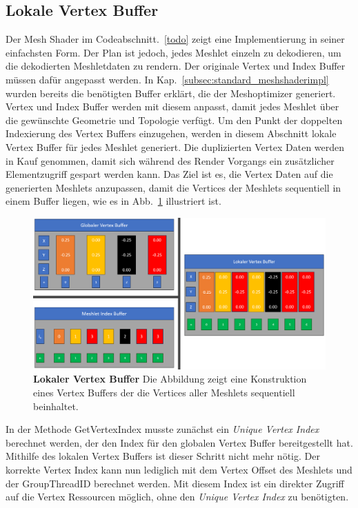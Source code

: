 \subsection{Lokale Vertex Buffer}
\label{subsec:local_vertex_buffers}
Der Mesh Shader im Codeabschnitt.~\ref{todo} zeigt eine Implementierung in seiner einfachsten Form.
Der Plan ist jedoch, jedes Meshlet einzeln zu dekodieren, um die dekodierten Meshletdaten zu rendern.
Der originale Vertex und Index Buffer müssen dafür angepasst werden.
In Kap.~\ref{subsec:standard_meshshaderimpl} wurden bereits die benötigten Buffer erklärt, die der Meshoptimizer generiert.
Vertex und Index Buffer werden mit diesem anpasst, damit jedes Meshlet über die gewünschte Geometrie und Topologie verfügt. \newline
Um den Punkt der doppelten Indexierung des Vertex Buffers einzugehen, werden in diesem Abschnitt lokale Vertex Buffer für jedes Meshlet generiert.
Die duplizierten Vertex Daten werden in Kauf genommen, damit sich während des Render Vorgangs ein zusätzlicher Elementzugriff gespart werden kann.
\newline
Das Ziel ist es, die Vertex Daten auf die generierten Meshlets anzupassen, damit die Vertices der Meshlets sequentiell in einem Buffer liegen, wie es in Abb.~\ref{fig:local_vertex_buffer} illustriert ist.
\begin{figure}[htb]
  \centering  
  \includegraphics[scale=0.375]{Bilder/local_vertex_buffer.png}
  \caption[Lokaler Vertex Buffer]{\textbf{Lokaler Vertex Buffer} Die Abbildung zeigt eine Konstruktion eines Vertex Buffers der die Vertices aller Meshlets sequentiell beinhaltet.}
  \label{fig:local_vertex_buffer}
\end{figure}

In der Methode GetVertexIndex musste zunächst ein \textit{Unique Vertex Index} berechnet werden, der den Index für den globalen Vertex Buffer bereitgestellt hat.
Mithilfe des lokalen Vertex Buffers ist dieser Schritt nicht mehr nötig.
Der korrekte Vertex Index kann nun lediglich mit dem Vertex Offset des Meshlets und der GroupThreadID berechnet werden.
Mit diesem Index ist ein direkter Zugriff auf die Vertex Ressourcen möglich, ohne den \textit{Unique Vertex Index} zu benötigten.